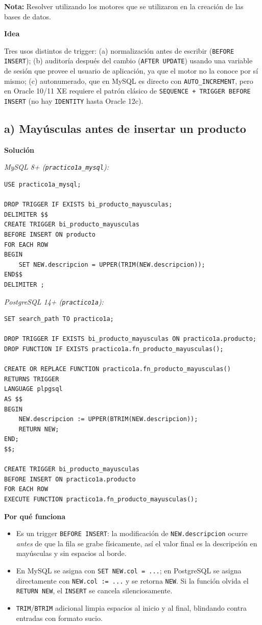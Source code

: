 \documentclass[11pt,a4paper]{article}
\newcommand{\itemcabecera}[1]{\noindent\textbf{#1}\par\medskip}
\newcommand{\bloqueIdea}{\itemcabecera{Idea}}
\newcommand{\bloqueSolucion}{\itemcabecera{Soluci\'on}}
\newcommand{\bloquePorque}{\itemcabecera{Por qu\'e funciona}}
\begin{document}
\textbf{Nota:} Resolver utilizando los motores que se utilizaron en la creación de las bases de datos.

\bloqueIdea

Tres usos distintos de trigger: (a) normalización antes de escribir (\texttt{BEFORE INSERT}); (b) auditoría después del cambio (\texttt{AFTER UPDATE}) usando una variable de sesión que provee el usuario de aplicación, ya que el motor no la conoce por sí mismo; (c) autonumerado, que en MySQL es directo con \texttt{AUTO\_INCREMENT}, pero en Oracle 10/11 XE requiere el patrón clásico de \texttt{SEQUENCE + TRIGGER BEFORE INSERT} (no hay \texttt{IDENTITY} hasta Oracle 12c).

\subsection{a) Mayúsculas antes de insertar un producto}

\bloqueSolucion

\textit{MySQL 8+ (\texttt{practico1a\_mysql}):}

\begin{lstlisting}
USE practico1a_mysql;

DROP TRIGGER IF EXISTS bi_producto_mayusculas;
DELIMITER $$
CREATE TRIGGER bi_producto_mayusculas
BEFORE INSERT ON producto
FOR EACH ROW
BEGIN
    SET NEW.descripcion = UPPER(TRIM(NEW.descripcion));
END$$
DELIMITER ;
\end{lstlisting}

\textit{PostgreSQL 14+ (\texttt{practico1a}):}

\begin{lstlisting}
SET search_path TO practico1a;

DROP TRIGGER IF EXISTS bi_producto_mayusculas ON practico1a.producto;
DROP FUNCTION IF EXISTS practico1a.fn_producto_mayusculas();

CREATE OR REPLACE FUNCTION practico1a.fn_producto_mayusculas()
RETURNS TRIGGER
LANGUAGE plpgsql
AS $$
BEGIN
    NEW.descripcion := UPPER(BTRIM(NEW.descripcion));
    RETURN NEW;
END;
$$;

CREATE TRIGGER bi_producto_mayusculas
BEFORE INSERT ON practico1a.producto
FOR EACH ROW
EXECUTE FUNCTION practico1a.fn_producto_mayusculas();
\end{lstlisting}

\bloquePorque

\begin{itemize}
    \item Es un trigger \texttt{BEFORE INSERT}: la modificación de \texttt{NEW.descripcion} ocurre \emph{antes} de que la fila se grabe físicamente, así el valor final es la descripción en mayúsculas y sin espacios al borde.
    \item En MySQL se asigna con \texttt{SET NEW.col = ...}; en PostgreSQL se asigna directamente con \texttt{NEW.col := ...} y se retorna \texttt{NEW}. Si la función olvida el \texttt{RETURN NEW}, el \texttt{INSERT} se cancela silenciosamente.
    \item \texttt{TRIM}/\texttt{BTRIM} adicional limpia espacios al inicio y al final, blindando contra entradas con formato sucio.
\end{itemize}
\end{document}

